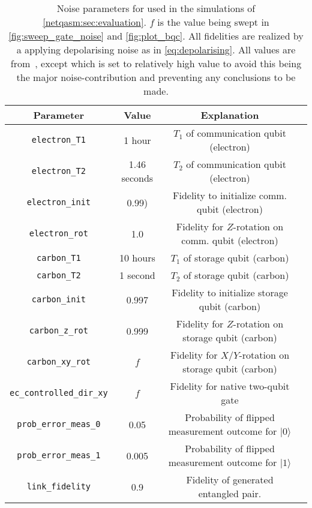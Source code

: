 \begin{table}
  \centering
  \begin{tabular}{||c|c|c|c||}
    \hline
    Parameter                 & Value        & Explanation                                                 \\
    \hline\hline
    \texttt{electron\_T1}          & 1 hour       & $T_1$ of communication qubit (electron)                     \\
    \texttt{electron\_T2}          & 1.46 seconds & $T_2$ of communication qubit (electron)                     \\
    \texttt{electron\_init}        & 0.99)        & Fidelity to initialize comm. qubit (electron)       \\
    \texttt{electron\_rot}         & 1.0          & Fidelity for $Z$-rotation on comm. qubit (electron) \\
    \texttt{carbon\_T1}            & 10 hours     & $T_1$ of storage qubit (carbon)                             \\
    \texttt{carbon\_T2}            & 1 second     & $T_2$ of storage qubit (carbon)                             \\
    \texttt{carbon\_init}          & 0.997        & Fidelity to initialize storage qubit (carbon)               \\
    \texttt{carbon\_z\_rot}         & 0.999        & Fidelity for $Z$-rotation on storage qubit (carbon)         \\
    \texttt{carbon\_xy\_rot}        & $f$          & Fidelity for $X$/$Y$-rotation on storage qubit (carbon)     \\
    \texttt{ec\_controlled\_dir\_xy} & $f$          & Fidelity for native two-qubit gate                          \\
    \texttt{prob\_error\_meas\_0}    & 0.05         & Probability of flipped measurement outcome for $|0\rangle$  \\
    \texttt{prob\_error\_meas\_1}    & 0.005        & Probability of flipped measurement outcome for $|1\rangle$  \\
    \texttt{link\_fidelity}        & 0.9          & Fidelity of generated entangled pair.                       \\
    \hline
  \end{tabular}
  \caption{
    Noise parameters for used in the simulations of \cref{netqasm:sec:evaluation}.
    $f$ is the value being swept in \cref{fig:sweep_gate_noise} and \cref{fig:plot_bqc}.
    All fidelities are realized by a applying depolarising noise as in \cref{eq:depolarising}.
    All values are from~\cite{coopmans2021netsquid}, except  which is set to relatively high value to avoid this being the major noise-contribution and preventing any conclusions to be made.
  }
  \label{tab:noise}
\end{table}

